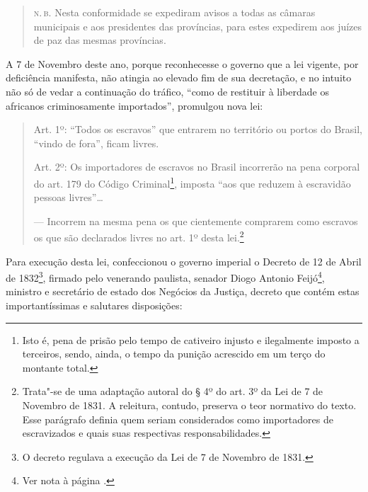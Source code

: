 \begin{quote}
\textsc{n.\,b.} Nesta conformidade se expediram avisos a todas as câmaras
municipais e aos presidentes das províncias, para estes expedirem aos
juízes de paz das mesmas províncias.
\end{quote}

A 7 de Novembro deste ano, porque reconhecesse o governo que a lei
vigente, por deficiência manifesta, não atingia ao elevado fim de sua
decretação, e no intuito não só de vedar a continuação do tráfico, ``como
de restituir à liberdade os africanos criminosamente importados'',
promulgou nova lei:

\begin{quote}
\forceindent{}Art. 1º: ``Todos os escravos'' que entrarem no território ou portos do
Brasil, ``vindo de fora'', ficam livres.

Art. 2º: Os importadores de escravos no Brasil incorrerão na pena
corporal do art. 179 do Código Criminal\footnote{Isto é, pena de
  prisão pelo tempo de cativeiro injusto e ilegalmente imposto a
  terceiros, sendo, ainda, o tempo da punição acrescido em um terço do
  montante total.}, imposta ``aos que reduzem à escravidão pessoas
livres''\ldots{}

--- Incorrem na mesma pena os que cientemente comprarem como escravos os
que são declarados livres no art. 1º desta lei.\footnote{Trata"-se de
  uma adaptação autoral do § 4º do art. 3º da Lei de 7 de Novembro de
  1831. A releitura, contudo, preserva o teor normativo do texto. Esse
  parágrafo definia quem seriam considerados como
  importadores de escravizados e quais suas respectivas
  responsabilidades.}
\end{quote}

Para execução desta lei, confeccionou o governo imperial o Decreto de 12
de Abril de 1832\footnote{O decreto regulava a execução da Lei de 7 de
  Novembro de 1831.}, firmado pelo venerando paulista, senador Diogo
Antonio Feijó\footnote{Ver nota à página \pageref{feijo}.}, ministro e secretário de
estado dos Negócios da Justiça, decreto que contém estas
importantíssimas e salutares disposições:

